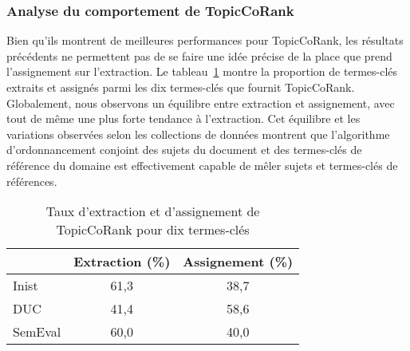       \subsubsection{Analyse du comportement de TopicCoRank}
      \label{subsubsec:main-domain_specific_keyphrase_annotation-supervised_automatic_keyphrase_annotation-evaluation-topiccorank-analysis}
        Bien qu'ils montrent de meilleures performances pour TopicCoRank, les
        résultats précédents ne permettent pas de se faire une idée précise de
        la place que prend l'assignement sur l'extraction. Le
        tableau~\ref{tab:assignment_ratio} montre la proportion de termes-clés
        extraits et assignés parmi les dix termes-clés que fournit TopicCoRank.
        Globalement, nous observons un équilibre entre extraction et
        assignement, avec tout de même une plus forte tendance à l'extraction.
        Cet équilibre et les variations observées selon les collections de
        données montrent que l'algorithme d'ordonnancement conjoint des sujets
        du document et des termes-clés de référence du domaine est effectivement
        capable de mêler sujets et termes-clés de références.
        \begin{table}[!h]
          \centering
          \begin{tabular}{l|cc}
              \toprule
              & Extraction (\%) & Assignement (\%)\\
              \hline
              Inist & 61,3 & 38,7\\
              DUC & 41,4 & 58,6\\
              SemEval & 60,0 & 40,0\\
              \bottomrule
          \end{tabular}
          \caption{Taux d'extraction et d'assignement de TopicCoRank pour dix
                   termes-clés
                   \label{tab:assignment_ratio}}
        \end{table}

